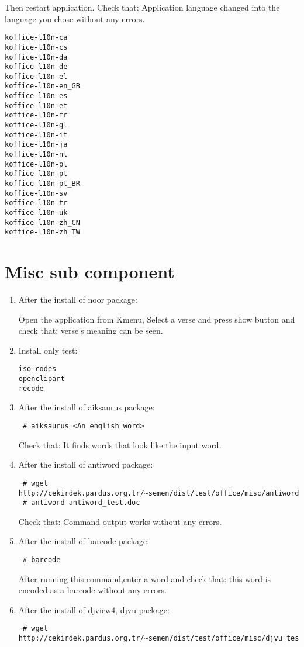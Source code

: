 \documentclass[a4paper,10pt]{article}
\begin{document}
Then restart application. Check that: Application language changed into the language you chose without any errors.

\begin{verbatim}
koffice-l10n-ca
koffice-l10n-cs
koffice-l10n-da
koffice-l10n-de
koffice-l10n-el
koffice-l10n-en_GB
koffice-l10n-es
koffice-l10n-et
koffice-l10n-fr
koffice-l10n-gl
koffice-l10n-it
koffice-l10n-ja
koffice-l10n-nl
koffice-l10n-pl
koffice-l10n-pt
koffice-l10n-pt_BR
koffice-l10n-sv
koffice-l10n-tr
koffice-l10n-uk
koffice-l10n-zh_CN
koffice-l10n-zh_TW
\end{verbatim}

\section{Misc sub component}
\begin{enumerate}
\item After the install of noor package:

Open the application from Kmenu, Select a verse and press show button and check that: verse's meaning can be seen.
\item Install only test:
\begin{verbatim}
iso-codes
openclipart
recode

\end{verbatim}
\item After the install of aiksaurus package:
\begin{verbatim}
 # aiksaurus <An english word>
\end{verbatim}

Check that: It finds words that look like the input word.

\item After the install of antiword package:
\begin{verbatim}
 # wget http://cekirdek.pardus.org.tr/~semen/dist/test/office/misc/antiword_test.doc
 # antiword antiword_test.doc
\end{verbatim}

Check that: Command output works without any errors.

\item After the install of barcode package:
\begin{verbatim}
 # barcode
\end{verbatim}
 After running this command,enter a word and check that: this word is encoded as a barcode without any errors.

\item After the install of djview4, djvu package:
\begin{verbatim}
 # wget http://cekirdek.pardus.org.tr/~semen/dist/test/office/misc/djvu_test.djvu
\end{verbatim}


\end{enumerate}
\end{document}
